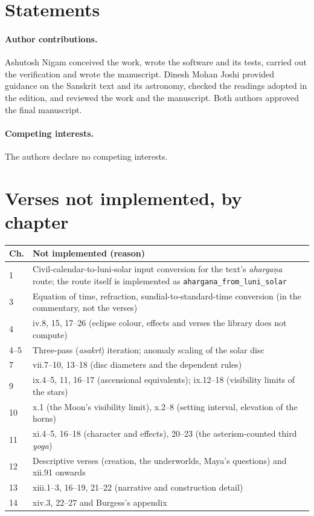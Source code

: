 \documentclass[11pt,a4paper]{article}
\begin{document}
\section*{Statements}

\paragraph{Author contributions.} Ashutosh Nigam conceived the work, wrote the software and its tests, carried out the verification and wrote the manuscript. Dinesh Mohan Joshi provided guidance on the Sanskrit text and its astronomy, checked the readings adopted in the edition, and reviewed the work and the manuscript. Both authors approved the final manuscript.

\paragraph{Competing interests.} The authors declare no competing interests.




\appendix
\section{Verses not implemented, by chapter}
\label{app:notdone}

\small
\begin{longtable}{@{}l p{}@{}}
\toprule
Ch. & Not implemented (reason) \\
\midrule
\endhead
1 & Civil-calendar-to-luni-solar input conversion for the text's \textit{aharga\d{n}a} route; the route itself is implemented as \texttt{ahargana\_from\_luni\_solar} \\
3 & Equation of time, refraction, sundial-to-standard-time conversion (in the commentary, not the verses) \\
4 & iv.8, 15, 17--26 (eclipse colour, effects and verses the library does not compute) \\
4--5 & Three-pass (\textit{asakrt}) iteration; anomaly scaling of the solar disc \\
7 & vii.7--10, 13--18 (disc diameters and the dependent rules) \\
9 & ix.4--5, 11, 16--17 (ascensional equivalents); ix.12--18 (visibility limits of the stars) \\
10 & x.1 (the Moon's visibility limit), x.2--8 (setting interval, elevation of the horns) \\
11 & xi.4--5, 16--18 (character and effects), 20--23 (the asterism-counted third \textit{yoga}) \\
12 & Descriptive verses (creation, the underworlds, Maya's questions) and xii.91 onwards \\
13 & xiii.1--3, 16--19, 21--22 (narrative and construction detail) \\
14 & xiv.3, 22--27 and Burgess's appendix \\
\bottomrule
\end{longtable}
\end{document}
